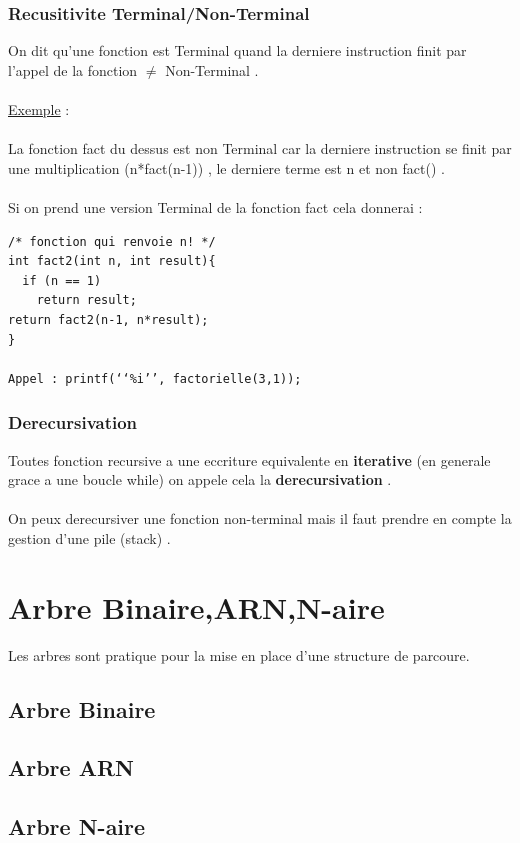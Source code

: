 \documentclass[a4paper,12pt,openany]{book}
\begin{document}
\subsection{Recusitivite Terminal/Non-Terminal}
On dit qu'une fonction est Terminal quand la derniere instruction finit par l'appel de la fonction $\neq$ Non-Terminal .\\
\\
\underline{Exemple} : \\
\\
La fonction fact du dessus est non Terminal car la derniere instruction se finit par une multiplication (n*fact(n-1)) , le derniere terme est n et non fact() .\\
\\
Si on prend une version Terminal de la fonction fact cela donnerai : \\
\begin{verbatim}
/* fonction qui renvoie n! */
int fact2(int n, int result){
  if (n == 1)
    return result;
return fact2(n-1, n*result);
}

Appel : printf(‘‘%i’’, factorielle(3,1));
\end{verbatim}


\subsection{Derecursivation}


Toutes fonction recursive a une eccriture equivalente en \textbf{iterative} (en generale grace a une boucle while) on appele cela la \textbf{derecursivation} .\\
\\
On peux derecursiver une fonction non-terminal mais il faut prendre en compte la gestion d'une pile (stack) .



\chapter{Arbre Binaire,ARN,N-aire}

Les arbres sont pratique pour la mise en place d'une structure de parcoure.\\

\section{Arbre Binaire}

\section{Arbre ARN}

\section{Arbre N-aire}
\end{document}
